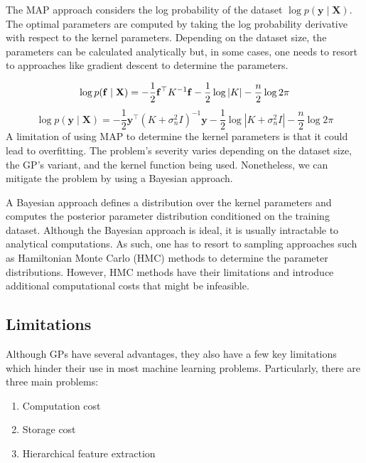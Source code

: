 \documentclass[letterpaper,11pt]{extarticle}
\begin{document}
The MAP approach considers the log probability of the dataset $\log p(\mathbf{y} \mid \mathbf{X})$. The optimal parameters are computed by taking the log probability derivative with respect to the kernel parameters. Depending on the dataset size, the parameters can be calculated analytically but, in some cases, one needs to resort to approaches like gradient descent to determine the parameters. 

$$
\log p(\mathbf{f} \mid \mathbf{X})=-\frac{1}{2} \mathbf{f}^{\top} K^{-1} \mathbf{f}-\frac{1}{2} \log |K|-\frac{n}{2} \log 2 \pi \\
$$
$$
\log p(\mathbf{y} \mid \mathbf{X})=-\frac{1}{2} \mathbf{y}^{\top}\left(K+\sigma_{n}^{2} I\right)^{-1} \mathbf{y}-\frac{1}{2} \log \left|K+\sigma_{n}^{2} I\right|-\frac{n}{2} \log 2 \pi
$$
A limitation of using MAP to determine the kernel parameters is that it could lead to overfitting. The problem's severity varies depending on the dataset size, the GP's variant, and the kernel function being used. Nonetheless, we can mitigate the problem by using a Bayesian approach. 

A Bayesian approach defines a distribution over the kernel parameters and computes the posterior parameter distribution conditioned on the training dataset. Although the Bayesian approach is ideal, it is usually intractable to analytical computations. As such, one has to resort to sampling approaches such as Hamiltonian Monte Carlo (HMC) methods \cite{Bishop06} to determine the parameter distributions. However, HMC methods have their limitations and introduce additional computational costs that might be infeasible. 

\subsection{Limitations}

Although GPs have several advantages, they also have a few key limitations which hinder their use in most machine learning problems. Particularly, there are three main problems:

\begin{enumerate}
\item Computation cost
\item Storage cost
\item Hierarchical feature extraction
\end{enumerate}
\end{document}
